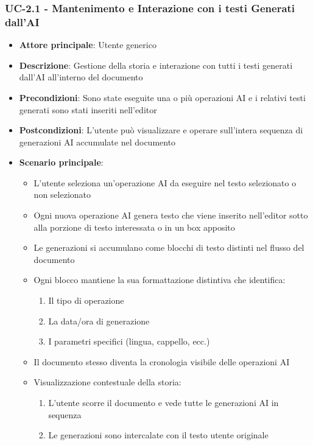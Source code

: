 \documentclass[11pt,a4paper]{article}
\begin{document}
\subsubsection{UC-2.1 - Mantenimento e Interazione con i testi Generati dall'AI}
\begin{itemize}
    \item \textbf{Attore principale}: Utente generico
    \item \textbf{Descrizione}: Gestione della storia e interazione con tutti i testi generati dall’AI all’interno
del documento
    \item \textbf{Precondizioni}: Sono state eseguite una o più operazioni AI e i relativi testi generati sono stati inseriti nell'editor
    \item \textbf{Postcondizioni}: L'utente può visualizzare e operare sull'intera sequenza di generazioni AI accumulate nel documento
    \item \textbf{Scenario principale}:
        \begin{itemize}
            \item L'utente seleziona un'operazione AI da eseguire nel testo selezionato o non selezionato
            \item Ogni nuova operazione AI genera testo che viene inserito nell'editor sotto alla porzione di testo interessata o in un box apposito
            \item Le generazioni si accumulano come blocchi di testo distinti nel flusso del documento
            \item Ogni blocco mantiene la sua formattazione distintiva che identifica:
                \begin{enumerate}
                    \item Il tipo di operazione
                    \item La data/ora di generazione
                    \item I parametri specifici (lingua, cappello, ecc.)
                \end{enumerate}
            \item Il documento stesso diventa la cronologia visibile delle operazioni AI
            \item Visualizzazione contestuale della storia:
                \begin{enumerate}
                    \item L'utente scorre il documento e vede tutte le generazioni AI in sequenza
                    \item Le generazioni sono intercalate con il testo utente originale

\end{enumerate}
\end{itemize}
\end{itemize}
\end{document}
